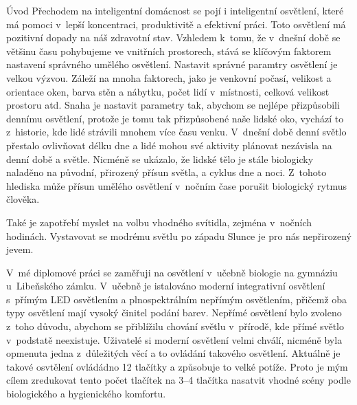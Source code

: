 \chap Úvod
Přechodem na inteligentní domácnost se pojí i inteligentní osvětlení, které má pomoci v~lepší koncentraci,
produktivitě a efektivní práci. Toto osvětlení má pozitivní dopady
na náš zdravotní stav. Vzhledem k~tomu, že v~dnešní době se většinu času pohybujeme ve vnitřních prostorech,
stává se klíčovým faktorem nastavení správného umělého osvětlení.
Nastavit správné paramtry osvětlení je velkou výzvou. Záleží na mnoha faktorech, jako je venkovní počasí,
velikost a orientace oken, barva stěn a nábytku, počet lidí v~místnosti,
celková velikost prostoru atd. Snaha je nastavit parametry tak, abychom se nejlépe přizpůsobili
dennímu osvětlení, protože je tomu tak přizpůsobené naše lidské oko, vychází to z~historie,
kde lidé strávili mnohem více času venku. V~dnešní době denní světlo přestalo ovlivňovat délku
dne a lidé mohou své aktivity plánovat nezávisla na denní době a světle. Nicméně se ukázalo, že lidské tělo je stále
biologicky naladěno na původní, přirozený přísun světla, a cyklus dne a noci. Z~tohoto
hlediska může přísun umělého osvětlení v~nočním čase porušit biologický rytmus
člověka.

\medskip
Také je zapotřebí myslet na volbu vhodného svítidla, zejména v~nočních hodinách. Vystavovat se modrému
světlu po západu Slunce je pro nás nepřirozený jevem.

\medskip
V~mé diplomové práci se zaměřuji na osvětlení v~učebně biologie na gymnáziu u~Libeňského zámku.
V~učebně je istalováno moderní integrativní osvětlení s~přímým LED osvětlením a
plnospektrálním nepřímým osvětlením, přičemž oba typy osvětlení mají vysoký činitel podání barev.
Nepřímé osvětlení bylo zvoleno z~toho důvodu, abychom se přiblížilu chování světlu
v~přírodě, kde přímé světlo v~podstatě neexistuje. Uživatelé si moderní osvětlení velmi chválí,
nicméně byla opmenuta jedna z~důležitých věcí a to ovládání takového osvětlení.
Aktuálně je takové osvtělení ovládádno 12 tlačítky a způsobuje to velké potíže.
Proto je mým cílem zredukovat tento počet tlačítek na 3--4 tlačítka nasatvit vhodné scény podle biologického
a hygienického komfortu.



